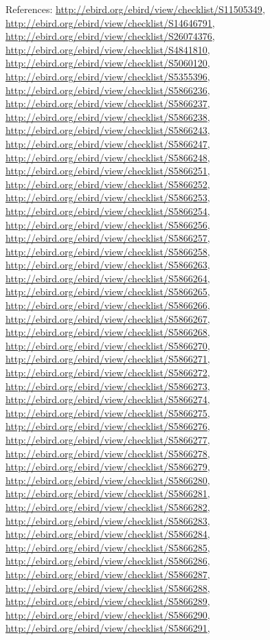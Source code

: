 \documentclass[9pt, article]{memoir}
\begin{document}
\begin{multicols}{2}
\vspace{6pt}References: 
\url{http://ebird.org/ebird/view/checklist/S11505349}, 
\url{http://ebird.org/ebird/view/checklist/S14646791}, 
\url{http://ebird.org/ebird/view/checklist/S26074376}, 
\url{http://ebird.org/ebird/view/checklist/S4841810}, 
\url{http://ebird.org/ebird/view/checklist/S5060120}, 
\url{http://ebird.org/ebird/view/checklist/S5355396}, 
\url{http://ebird.org/ebird/view/checklist/S5866236}, 
\url{http://ebird.org/ebird/view/checklist/S5866237}, 
\url{http://ebird.org/ebird/view/checklist/S5866238}, 
\url{http://ebird.org/ebird/view/checklist/S5866243}, 
\url{http://ebird.org/ebird/view/checklist/S5866247}, 
\url{http://ebird.org/ebird/view/checklist/S5866248}, 
\url{http://ebird.org/ebird/view/checklist/S5866251}, 
\url{http://ebird.org/ebird/view/checklist/S5866252}, 
\url{http://ebird.org/ebird/view/checklist/S5866253}, 
\url{http://ebird.org/ebird/view/checklist/S5866254}, 
\url{http://ebird.org/ebird/view/checklist/S5866256}, 
\url{http://ebird.org/ebird/view/checklist/S5866257}, 
\url{http://ebird.org/ebird/view/checklist/S5866258}, 
\url{http://ebird.org/ebird/view/checklist/S5866263}, 
\url{http://ebird.org/ebird/view/checklist/S5866264}, 
\url{http://ebird.org/ebird/view/checklist/S5866265}, 
\url{http://ebird.org/ebird/view/checklist/S5866266}, 
\url{http://ebird.org/ebird/view/checklist/S5866267}, 
\url{http://ebird.org/ebird/view/checklist/S5866268}, 
\url{http://ebird.org/ebird/view/checklist/S5866270}, 
\url{http://ebird.org/ebird/view/checklist/S5866271}, 
\url{http://ebird.org/ebird/view/checklist/S5866272}, 
\url{http://ebird.org/ebird/view/checklist/S5866273}, 
\url{http://ebird.org/ebird/view/checklist/S5866274}, 
\url{http://ebird.org/ebird/view/checklist/S5866275}, 
\url{http://ebird.org/ebird/view/checklist/S5866276}, 
\url{http://ebird.org/ebird/view/checklist/S5866277}, 
\url{http://ebird.org/ebird/view/checklist/S5866278}, 
\url{http://ebird.org/ebird/view/checklist/S5866279}, 
\url{http://ebird.org/ebird/view/checklist/S5866280}, 
\url{http://ebird.org/ebird/view/checklist/S5866281}, 
\url{http://ebird.org/ebird/view/checklist/S5866282}, 
\url{http://ebird.org/ebird/view/checklist/S5866283}, 
\url{http://ebird.org/ebird/view/checklist/S5866284}, 
\url{http://ebird.org/ebird/view/checklist/S5866285}, 
\url{http://ebird.org/ebird/view/checklist/S5866286}, 
\url{http://ebird.org/ebird/view/checklist/S5866287}, 
\url{http://ebird.org/ebird/view/checklist/S5866288}, 
\url{http://ebird.org/ebird/view/checklist/S5866289}, 
\url{http://ebird.org/ebird/view/checklist/S5866290}, 
\url{http://ebird.org/ebird/view/checklist/S5866291}, 

\end{multicols}
\end{document}
